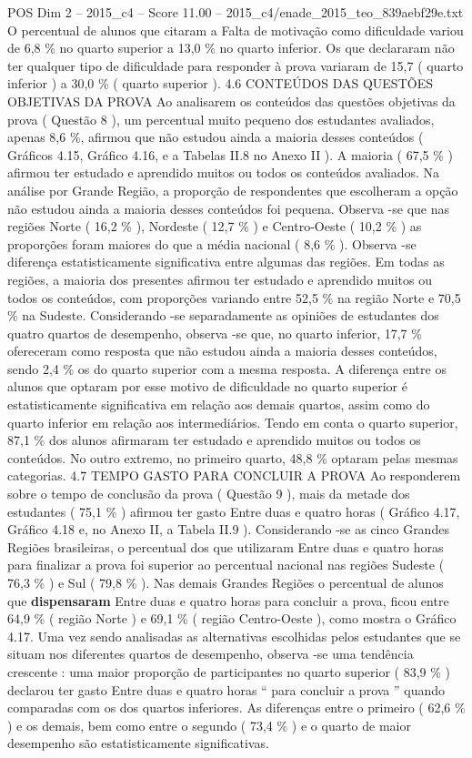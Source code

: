 \begin{textsample}{POS Dim 2 – 2015\_c4 – Score 11.00 – 2015\_c4/enade\_2015\_teo\_839aebf29e.txt}
O percentual de alunos que citaram a Falta de motivação como dificuldade variou de 6,8 \% no quarto superior a 13,0 \% no quarto inferior.
Os que declararam não ter qualquer tipo de dificuldade para responder à prova variaram de 15,7 ( quarto inferior ) a 30,0 \% ( quarto superior ). 4.6 CONTEÚDOS DAS QUESTÕES OBJETIVAS DA PROVA Ao analisarem os conteúdos das questões objetivas da prova ( Questão 8 ), um percentual muito pequeno dos estudantes avaliados, apenas 8,6 \%, afirmou que não estudou ainda a maioria desses conteúdos ( Gráficos 4.15, Gráfico 4.16, e a Tabelas II.8 no Anexo II ).
A maioria ( 67,5 \% ) afirmou ter estudado e aprendido muitos ou todos os conteúdos avaliados.
Na análise por Grande Região, a proporção de respondentes que escolheram a opção não estudou ainda a maioria desses conteúdos foi pequena.
Observa -se que nas regiões Norte ( 16,2 \% ), Nordeste ( 12,7 \% ) e Centro-Oeste ( 10,2 \% ) as proporções foram maiores do que a média nacional ( 8,6 \% ).
Observa -se diferença estatisticamente significativa entre algumas das regiões.
Em todas as regiões, a maioria dos presentes afirmou ter estudado e aprendido muitos ou todos os conteúdos, com proporções variando entre 52,5 \% na região Norte e 70,5 \% na Sudeste.
Considerando -se separadamente as opiniões de estudantes dos quatro quartos de desempenho, observa -se que, no quarto inferior, 17,7 \% ofereceram como resposta que não estudou ainda a maioria desses conteúdos, sendo 2,4 \% os do quarto superior com a mesma resposta.
A diferença entre os alunos que optaram por esse motivo de dificuldade no quarto superior é estatisticamente significativa em relação aos demais quartos, assim como do quarto inferior em relação aos intermediários.
Tendo em conta o quarto superior, 87,1 \% dos alunos afirmaram ter estudado e aprendido muitos ou todos os conteúdos.
No outro extremo, no primeiro quarto, 48,8 \% optaram pelas mesmas categorias. 4.7 TEMPO GASTO PARA CONCLUIR A PROVA Ao responderem sobre o tempo de conclusão da prova ( Questão 9 ), mais da metade dos estudantes ( 75,1 \% ) afirmou ter gasto Entre duas e quatro horas ( Gráfico 4.17, Gráfico 4.18 e, no Anexo II, a Tabela II.9 ).
Considerando -se as cinco Grandes Regiões brasileiras, o percentual dos que utilizaram Entre duas e quatro horas para finalizar a prova foi superior ao percentual nacional nas regiões Sudeste ( 76,3 \% ) e Sul ( 79,8 \% ).
Nas demais Grandes Regiões o percentual de alunos que \textbf{dispensaram} Entre duas e quatro horas para concluir a prova, ficou entre 64,9 \% ( região Norte ) e 69,1 \% ( região Centro-Oeste ), como mostra o Gráfico 4.17.
Uma vez sendo analisadas as alternativas escolhidas pelos estudantes que se situam nos diferentes quartos de desempenho, observa -se uma tendência crescente : uma maior proporção de participantes no quarto superior ( 83,9 \% ) declarou ter gasto Entre duas e quatro horas “ para concluir a prova ” quando comparadas com os dos quartos inferiores.
As diferenças entre o primeiro ( 62,6 \% ) e os demais, bem como entre o segundo ( 73,4 \% ) e o quarto de maior desempenho são estatisticamente significativas.


\end{textsample}
